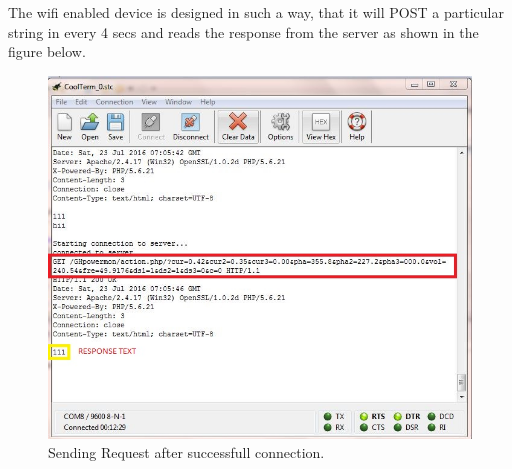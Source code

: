 \documentclass[a4paper,12pt,oneside]{book}
\begin{document}
The wifi enabled device is designed in such a way, that it will POST a particular string in every 4 secs and reads the response from the server as shown in the figure below. 

\begin{figure}[H]
	\centering
	\includegraphics[width=15cm]{coolterm1.jpg}
	\caption{Sending Request after successfull connection.}
	\label{29}
\end{figure}
\end{document}
